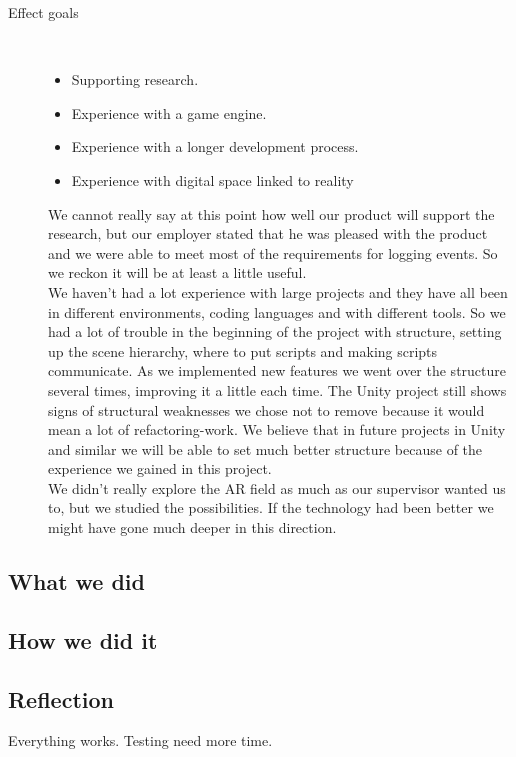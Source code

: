 \begin{description}
	\item[Effect goals]\ 
	\begin{itemize}
		\item Supporting research.
		\item Experience with a game engine.
		\item Experience with a longer development process.
		\item Experience with digital space linked to reality
	\end{itemize}
	We cannot really say at this point how well our product will support the research, but our employer stated that he was pleased with the product and we were able to meet most of the requirements for logging events. 
	So we reckon it will be at least a little useful.\\
	We haven't had a lot experience with large projects and they have all been in different environments, coding languages and with different tools. 
	So we had a lot of trouble in the beginning of the project with structure, setting up the scene hierarchy, where to put scripts and making scripts communicate. 
	As we implemented new features we went over the structure several times, improving it a little each time. 
	The Unity project still shows signs of structural weaknesses we chose not to remove because it would mean a lot of refactoring-work. 
	We believe that in future projects in Unity and similar we will be able to set much better structure because of the experience we gained in this project.\\
	We didn't really explore the AR field as much as our supervisor wanted us to, but we studied the possibilities. 
	If the technology had been better we might have gone much deeper in this direction.


\end{description}


\subsection{What we did}

\subsection{How we did it}

\subsection{Reflection}
Everything works.
Testing need more time.